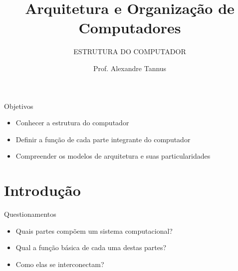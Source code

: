 \documentclass[aspectratio=169,
				xcolor=table]{beamer}
\institute[]{\uppercase{Engenharia de Software}}
\title[]{Arquitetura e Organização de Computadores}
\subtitle[]{\uppercase{Estrutura do Computador}}
\author[]{Prof. Alexandre Tannus}
\date{}
\begin{document}
	\begin{frame}
		\titlepage
	\end{frame}

	\begin{frame}{Objetivos}
		\begin{itemize}
			\item Conhecer a estrutura do computador
			\vspace{1em}
			\item Definir a função de cada parte integrante do computador
			\vspace{1em}
			\item Compreender os modelos de arquitetura e suas particularidades
		\end{itemize}
	\end{frame}
	

	\begin{frame}
		\tableofcontents		
	\end{frame}	
	
	\section{Introdução}
		
		\begin{frame}{Questionamentos}
			\begin{itemize}
				\item Quais partes compõem um sistema computacional?
				\vspace{1em}
				\item Qual a função básica de cada uma destas partes?
				\vspace{1em}
				\item Como elas se interconectam?
			\end{itemize}
		\end{frame}
		
\end{document}
